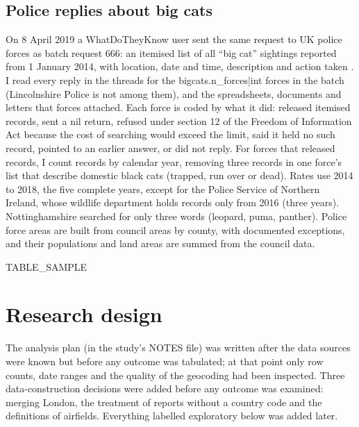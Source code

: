 \documentclass[11pt,a4paper]{article}
\begin{document}
\subsection{Police replies about big cats}
On 8 April 2019 a WhatDoTheyKnow user sent the same request to UK police forces as batch request 666: an itemised list of all ``big cat'' sightings reported from 1 January 2014, with location, date and time, description and action taken \citep{wdtk2019}. I read every reply in the threads for the {{bigcats.n_forces|int}} forces in the batch (Lincolnshire Police is not among them), and the spreadsheets, documents and letters that forces attached. Each force is coded by what it did: released itemised records, sent a nil return, refused under section 12 of the Freedom of Information Act because the cost of searching would exceed the limit, said it held no such record, pointed to an earlier answer, or did not reply. For forces that released records, I count records by calendar year, removing three records in one force's list that describe domestic black cats (trapped, run over or dead). Rates use 2014 to 2018, the five complete years, except for the Police Service of Northern Ireland, whose wildlife department holds records only from 2016 (three years). Nottinghamshire searched for only three words (leopard, puma, panther). Police force areas are built from council areas by county, with documented exceptions, and their populations and land areas are summed from the council data.

{{TABLE_SAMPLE}}

\section{Research design}\label{sec:design}
The analysis plan (in the study's NOTES file) was written after the data sources were known but before any outcome was tabulated; at that point only row counts, date ranges and the quality of the geocoding had been inspected. Three data-construction decisions were added before any outcome was examined: merging London, the treatment of reports without a country code and the definitions of airfields. Everything labelled exploratory below was added later.
\end{document}
